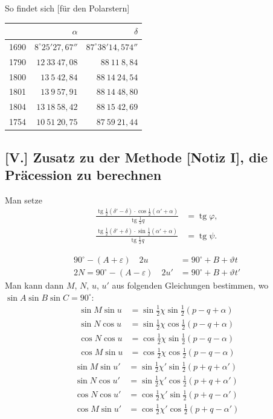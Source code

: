 \documentclass[12pt,a4paper]{article}
\theoremstyle{plain}
\theoremstyle{definition}
\theoremstyle{remark}
\DeclareMathOperator{\tg}{tg}
\begin{document}
So findet sich [f\"ur den Polarstern]
\begin{center}
\begin{tabular}{r|r|r}
& $\alpha$ & $\delta$ \\
\hline
1690 & $8^{\circ}25'27{,}67''$ & $87^{\circ}38'14{,}574''$ \\
1790 & $12\ 33\ 47{,}08$ & $88\ 11\ 8{,}84$ \\
1800 & $13\ 5\ 42{,}84$ & $88\ 14\ 24{,}54$ \\
1801 & $13\ 9\ 57{,}91$ & $88\ 14\ 48{,}80$ \\
1804 & $13\ 18\ 58{,}42$ & $88\ 15\ 42{,}69$ \\
1754 & $10\ 51\ 20{,}75$ & $87\ 59\ 21{,}44$
\end{tabular}
\end{center}

\subsection*{[V.] Zusatz zu der Methode [Notiz I], die Pr\"acession zu berechnen}

Man setze
\begin{align*}
\tfrac{\tg\tfrac{1}{2}(\delta' - \delta) \cdot \cos\tfrac{1}{2}(\alpha' + \alpha)}{\tg\tfrac{1}{2}q} &= \tg\varphi, \\
\tfrac{\tg\tfrac{1}{2}(\delta' + \delta) \cdot \sin\tfrac{1}{2}(\alpha' + \alpha)}{\tg\tfrac{1}{2}q} &= \tg\psi.
\end{align*}

\newpage

\begin{align*}
90^{\circ} - (A + \varepsilon) \quad 2u &= 90^{\circ} + B + \vartheta t \\
2N = 90^{\circ} - (A - \varepsilon) \quad 2u' &= 90^{\circ} + B + \vartheta t'
\end{align*}
Man kann dann $M$, $N$, $u$, $u'$ aus folgenden Gleichungen bestimmen, wo
$\sin A \sin B \sin C = 90^{\circ}$:
\begin{align*}
\sin M \sin u &= \sin\tfrac{1}{2}\chi \sin\tfrac{1}{2}(p - q + \alpha) \\
\sin N \cos u &= \sin\tfrac{1}{2}\chi \cos\tfrac{1}{2}(p - q + \alpha) \\
\cos N \cos u &= \cos\tfrac{1}{2}\chi \sin\tfrac{1}{2}(p - q - \alpha) \\
\cos M \sin u &= \cos\tfrac{1}{2}\chi \cos\tfrac{1}{2}(p - q - \alpha)
\end{align*}
\begin{align*}
\sin M \sin u' &= \sin\tfrac{1}{2}\chi' \sin\tfrac{1}{2}(p + q + \alpha') \\
\sin N \cos u' &= \sin\tfrac{1}{2}\chi' \cos\tfrac{1}{2}(p + q + \alpha') \\
\cos N \cos u' &= \cos\tfrac{1}{2}\chi' \sin\tfrac{1}{2}(p + q - \alpha') \\
\cos M \sin u' &= \cos\tfrac{1}{2}\chi' \cos\tfrac{1}{2}(p + q - \alpha')
\end{align*}
\end{document}
